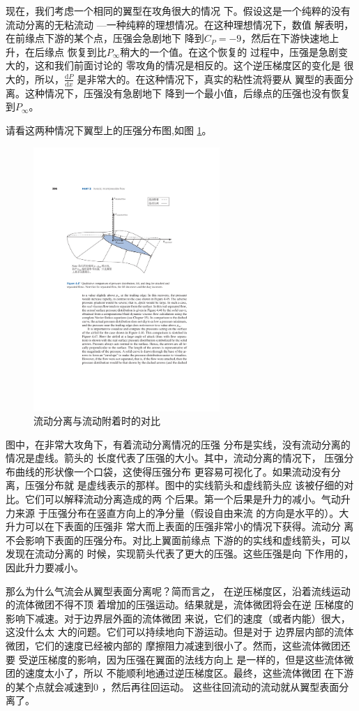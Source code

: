 现在，我们考虑一个相同的翼型在攻角很大的情况
下。假设这是一个纯粹的没有流动分离的无粘流动
---一种纯粹的理想情况。在这种理想情况下，数值
解表明，在前缘点下游的某个点，压强会急剧地下
降到$C_P=-9$，然后在下游快速地上升，在后缘点
恢复到比$P_\infty$稍大的一个值。在这个恢复的
过程中，压强是急剧变大的，这和我们前面讨论的
零攻角的情况是相反的。这个逆压梯度区的变化是
很大的，所以，$\frac{\mathrm{d}P }{\mathrm{d}x }$
是非常大的。在这种情况下，真实的粘性流将要从
翼型的表面分离。这种情况下，压强没有急剧地下
降到一个最小值，后缘点的压强也没有恢复到$P_\infty$。

请看这两种情况下翼型上的压强分布图,如图
\ref{fig:sepratedflow}。
\begin{figure}[!ht]
  \centering
  \includegraphics[height=10cm]{./aerodynamics/seprated_flow.pdf}
  \caption{流动分离与流动附着时的对比}
  \label{fig:sepratedflow}
\end{figure}
图中，在非常大攻角下，有着流动分离情况的压强
分布是实线，没有流动分离的情况是虚线。箭头的
长度代表了压强的大小。其中，流动分离的情况下，
压强分布曲线的形状像一个口袋，这使得压强分布
更容易可视化了。如果流动没有分离，压强分布就
是虚线表示的那样。图中的实线箭头和虚线箭头应
该被仔细的对比。它们可以解释流动分离造成的两
个后果。第一个后果是升力的减小。气动升力来源
于压强分布在竖直方向上的净分量（假设自由来流
的方向是水平的）。大升力可以在下表面的压强非
常大而上表面的压强非常小的情况下获得。流动分
离不会影响下表面的压强分布。对比上翼面前缘点
下游的的实线和虚线箭头，可以发现在流动分离的
时候，实现箭头代表了更大的压强。这些压强是向
下作用的，因此升力要减小。

那么为什么气流会从翼型表面分离呢？简而言之，
在逆压梯度区，沿着流线运动的流体微团不得不顶
着增加的压强运动。结果就是，流体微团将会在逆
压梯度的影响下减速。对于边界层外面的流体微团
来说，它们的速度（或者内能）很大，这没什么太
大的问题。它们可以持续地向下游运动。但是对于
边界层内部的流体微团，它们的速度已经被内部的
摩擦阻力减速到很小了。然而，这些流体微团还要
受逆压梯度的影响，因为压强在翼面的法线方向上
是一样的，但是这些流体微团的速度太小了，所以
不能顺利地通过逆压梯度区。最终，这些流体微团
在下游的某个点就会减速到0 ，然后再往回运动。
这些往回流动的流动就从翼型表面分离了。

